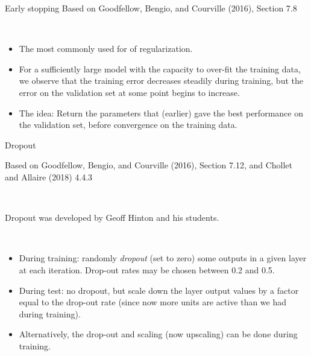\documentclass[
  10pt,
  ignorenonframetext,
  twocolumn]{beamer}
\providecommand{\tightlist}{%
  \setlength{\itemsep}{0pt}\setlength{\parskip}{0pt}}
\begin{document}
\begin{frame}
\begin{block}{Early stopping}
\label{early-stopping}
\tiny Based on Goodfellow, Bengio, and Courville (2016), Section 7.8

\normalsize

\(~\)

\begin{itemize}
\tightlist
\item
  The most commonly used for of regularization.
\end{itemize}

\vspace{2mm}

\begin{itemize}
\tightlist
\item
  For a sufficiently large model with the capacity to over-fit the
  training data, we observe that the training error decreases steadily
  during training, but the error on the validation set at some point
  begins to increase.
\end{itemize}

\vspace{2mm}

\begin{itemize}
\tightlist
\item
  The idea: Return the parameters that (earlier) gave the best
  performance on the validation set, before convergence on the training
  data.
\end{itemize}
\end{block}
\end{frame}

\begin{frame}
\begin{block}{Dropout}
\label{dropout}
\tiny

Based on Goodfellow, Bengio, and Courville (2016), Section 7.12, and
Chollet and Allaire (2018) 4.4.3

\normalsize

\(~\)

Dropout was developed by Geoff Hinton and his students.

\(~\)

\begin{itemize}
\item
  During training: randomly \emph{dropout} (set to zero) some outputs in
  a given layer at each iteration. Drop-out rates may be chosen between
  0.2 and 0.5. \vspace{1mm}
\item
  During test: no dropout, but scale down the layer output values by a
  factor equal to the drop-out rate (since now more units are active
  than we had during training). \vspace{1mm}
\item
  Alternatively, the drop-out and scaling (now upscaling) can be done
  during training. \vspace{1mm}
\end{itemize}
\end{block}
\end{frame}
\end{document}
